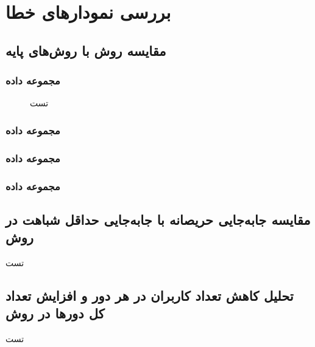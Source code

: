 \chapter{بررسی نمودارهای خطا}

\section{
	مقایسه روش
	با روش‌های پایه
}


\subsection{
	مجموعه داده
}

\begin{figure}[h]
	\centering
	\hspace{1.5mm}
	\caption{
		تست
	}
	\label{mylabel111}
\end{figure}



\FloatBarrier
\subsection{
	مجموعه داده
}



\subsection{
	مجموعه داده
}



\subsection{
	مجموعه داده
}



\section{
	مقایسه جابه‌جایی حریصانه با جابه‌جایی حداقل شباهت در روش
}
تست


\section{
	تحلیل کاهش تعداد کاربران در هر دور و افزایش تعداد کل دورها در روش
}
تست
